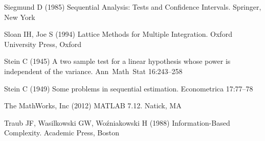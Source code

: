 \documentclass[graybox]{svmult}
\begin{document}
\begin{thebibliography}{29}
Siegmund D (1985) Sequential Analysis: Tests and Confidence Intervals.
  Springer, New York

Sloan IH, Joe S (1994) Lattice Methods for Multiple Integration. Oxford
  University Press, Oxford

Stein C (1945) A two sample test for a linear hypothesis whose power is
  independent of the variance. Ann\ Math\ Stat 16:243--258

Stein C (1949) Some problems in sequential estimation. Econometrica 17:77--78

{The MathWorks, Inc} (2012) {MATLAB} 7.12. Natick, MA

Traub JF, Wasilkowski GW, Wo\'zniakowski H (1988) Information-Based Complexity.
  Academic Press, Boston

\end{thebibliography}
\end{document}

